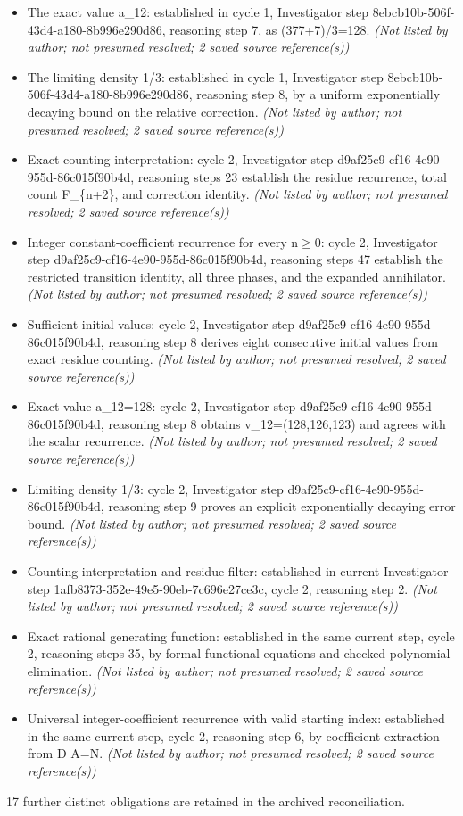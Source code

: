 \documentclass[11pt]{article}
\begin{document}
\begin{itemize}
\item The exact value a\_\allowbreak{}12: established in cycle 1, Investigator step 8ebcb10b-506f-43d4-a180-8b996e290d86, reasoning step 7, as (377+7)/3=128. \textit{ (Not listed by author; not presumed resolved; 2 saved source reference(s))}
\item The limiting density 1/3: established in cycle 1, Investigator step 8ebcb10b-506f-43d4-a180-8b996e290d86, reasoning step 8, by a uniform exponentially decaying bound on the relative correction. \textit{ (Not listed by author; not presumed resolved; 2 saved source reference(s))}
\item Exact counting interpretation: cycle 2, Investigator step d9af25c9-cf16-4e90-955d-86c015f90b4d, reasoning steps 2\textendash{}3 establish the residue recurrence, total count F\_\allowbreak{}\{n+2\}, and correction identity. \textit{ (Not listed by author; not presumed resolved; 2 saved source reference(s))}
\item Integer constant-coefficient recurrence for every n$\geq$0: cycle 2, Investigator step d9af25c9-cf16-4e90-955d-86c015f90b4d, reasoning steps 4\textendash{}7 establish the restricted transition identity, all three phases, and the expanded annihilator. \textit{ (Not listed by author; not presumed resolved; 2 saved source reference(s))}
\item Sufficient initial values: cycle 2, Investigator step d9af25c9-cf16-4e90-955d-86c015f90b4d, reasoning step 8 derives eight consecutive initial values from exact residue counting. \textit{ (Not listed by author; not presumed resolved; 2 saved source reference(s))}
\item Exact value a\_\allowbreak{}12=128: cycle 2, Investigator step d9af25c9-cf16-4e90-955d-86c015f90b4d, reasoning step 8 obtains v\_\allowbreak{}12=(128,126,123) and agrees with the scalar recurrence. \textit{ (Not listed by author; not presumed resolved; 2 saved source reference(s))}
\item Limiting density 1/3: cycle 2, Investigator step d9af25c9-cf16-4e90-955d-86c015f90b4d, reasoning step 9 proves an explicit exponentially decaying error bound. \textit{ (Not listed by author; not presumed resolved; 2 saved source reference(s))}
\item Counting interpretation and residue filter: established in current Investigator step 1afb8373-352e-49e5-90eb-7c696e27ce3c, cycle 2, reasoning step 2. \textit{ (Not listed by author; not presumed resolved; 2 saved source reference(s))}
\item Exact rational generating function: established in the same current step, cycle 2, reasoning steps 3\textendash{}5, by formal functional equations and checked polynomial elimination. \textit{ (Not listed by author; not presumed resolved; 2 saved source reference(s))}
\item Universal integer-coefficient recurrence with valid starting index: established in the same current step, cycle 2, reasoning step 6, by coefficient extraction from D A=N. \textit{ (Not listed by author; not presumed resolved; 2 saved source reference(s))}
\end{itemize}
17 further distinct obligations are retained in the archived reconciliation.
\end{document}
